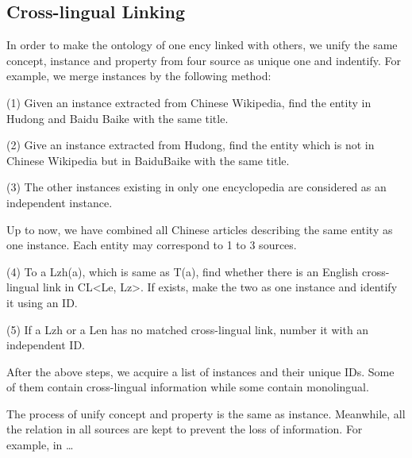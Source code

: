 \documentclass[runningheads,a4paper]{llncs}
\begin{document}
\subsection{Cross-lingual Linking}
\label{sec:cll}
In order to make the ontology of one ency linked with others, we unify the same concept, instance and property from four source as unique one and indentify. For example, we merge instances by the following method:

(1) Given an instance extracted from Chinese Wikipedia, find the entity in Hudong and Baidu Baike with the same title. 

(2) Give an instance extracted from Hudong, find the entity which is not in Chinese Wikipedia but in BaiduBaike with the same title.

(3) The other instances existing in only one encyclopedia are considered as an independent instance.

Up to now, we have combined all Chinese articles describing the same entity as one instance. Each entity may correspond to 1 to 3 sources.

(4) To a Lzh(a), which is same as T(a), find whether there is an English cross-lingual link in CL<Le, Lz>. If exists, make the two as one instance and identify it using an ID.

(5) If a Lzh or a Len has no matched cross-lingual link, number it with an independent ID.

After the above steps, we acquire a list of instances and their unique IDs. Some of them contain cross-lingual information while some contain monolingual.

The process of unify concept and property is the same as instance. Meanwhile, all the relation in all sources are kept to prevent the loss of information. For example, in …
\end{document}
